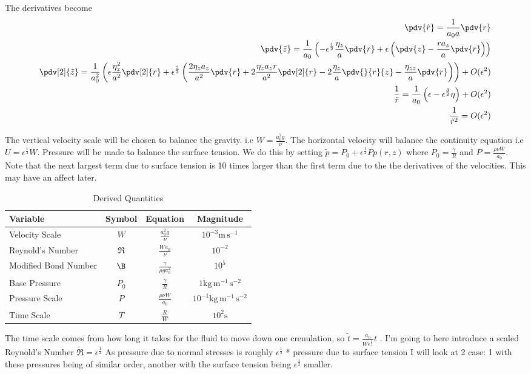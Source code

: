 \documentclass[12pt]{article}
\newcommand{\rt}{^{\frac{1}{2}}}
\newcommand{\rtt}{^{\frac{3}{2}}}
\begin{document}
The derivatives become
	\begin{align}
\pdv{\tilde r } = \frac{1}{a_0a}\pdv{r}\\
\pdv{\tilde z} = \frac{1}{a_0}\left(-\epsilon\rt\frac{\eta_z}{a}\pdv{r}+\epsilon\left(\pdv{z}-\frac{ra_z}{a}\pdv{r}\right)\right)\\
\pdv[2]{\tilde z}= \frac{1}{a_0^2}\left(\epsilon\frac{\eta_z^2}{a^2}\pdv[2]{r}+\epsilon\rtt\left(\frac{2\eta_za_z}{a^2}\pdv{r}+2\frac{\eta_za_zr}{a^2}\pdv[2]{r}-2\frac{\eta_z}{a}\pdv{}{r}{z}-\frac{\eta_{zz}}{a}\pdv{r}\right)\right) +O(\epsilon^2)\\
\frac{1}{\tilde r} = \frac{1}{a_0}\left(\epsilon-\epsilon\rtt\eta\right)+O(\epsilon^2)\\
\frac{1}{\tilde r^2} = O(\epsilon^2)
\end{align}

The vertical velocity scale will be chosen to balance the gravity. i.e $W = \frac{a_0^2g}{\nu}$. The horizontal velocity will balance the continuity equation i.e $U  =\epsilon\rt W$. Pressure will be made to balance the surface tension. We do this by setting $\tilde p = P_0 + \epsilon\rt P p(r,z)$ where $P_0 = \frac{\gamma}{R}$ and $P = \frac{\rho\nu W}{a_0}$. Note that the next largest term due to surface tension is 10 times larger than the first term due to the the derivatives of the velocities. This may have an affect later. 
	\begin{table}[H]
	\centering
	\caption{Derived Quantities}
	\begin{tabular}{|l|c|c|c|}
		\hline
		Variable&Symbol &Equation& Magnitude\\
		\hline
		Velocity Scale & $W$& $\frac{a_0^2g}{\nu}$& $10^{-3}\mathrm{m\,s^{-1}}$\\
		Reynold's Number &$\Re$&$\frac{Wa_0}{\nu}$& $10^{-2}$ \\
		Modified Bond Number & $\B$&$\frac{\gamma}{\rho g a_0^2}$& $10^5$\\
		Base Pressure & $P_0$ & $\frac{\gamma}{R}$& $1\mathrm{kg\,m^{-1}\,s^{-2}}$\\
		Pressure Scale & $P$& $\frac{\rho\nu W}{a_0}$& $10^{-1}\mathrm{kg\,m^{-1}\,s^{-2}}$\\
		Time Scale & $T$& $\frac{R}{W}$&$10^2\mathrm{s}$
		\\ \hline
	\end{tabular}
\end{table}
The time scale comes from how long it takes for the fluid to move down one crenulation, so $\tilde t =\frac{a_0}{W\epsilon\rt} t $ . I'm going to here introduce a scaled Reynold's Number $\tilde\Re = \epsilon\rt$
As pressure due to normal stresses is roughly $\epsilon^\frac{1}{4}$ * pressure due to surface tension I will look at 2 case: 1 with these pressures being of similar order, another with the surface tension being $\epsilon\rt$ smaller.
\end{document}
